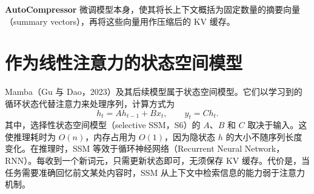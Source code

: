 \textbf{AutoCompressor} 微调模型本身，使其将长上下文概括为固定数量的摘要向量（summary vectors），再将这些向量用作压缩后的 KV 缓存。

\section{作为线性注意力的状态空间模型}

Mamba（Gu 与 Dao，2023）及其后续模型属于状态空间模型。它们以学习到的循环状态代替注意力来处理序列，计算方式为
\[
  h_t=Ah_{t-1}+Bx_t,\qquad y_t=Ch_t.
\]
其中，选择性状态空间模型（selective SSM，S6）的 \(A\)、\(B\) 和 \(C\) 取决于输入。这使推理耗时为 \(O(n)\)，内存占用为 \(O(1)\)，因为隐状态 \(h\) 的大小不随序列长度变化。在推理时，SSM 等效于循环神经网络（Recurrent Neural Network，RNN）。每收到一个新词元，只需更新状态即可，无须保存 KV 缓存。代价是，当任务需要准确回忆前文某处内容时，SSM 从上下文中检索信息的能力弱于注意力机制。

